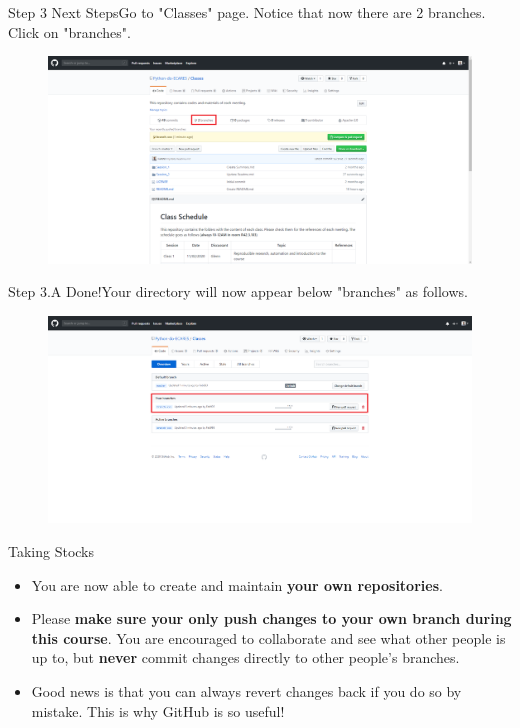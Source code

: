 \documentclass[aspectratio=169]{beamer}
\begin{document}
\begin{frame}{Step 3 Next Steps}{Go to "Classes" page. Notice that now there are 2 branches. Click on "branches".}
	\begin{figure}
		\centering
		\includegraphics[width=0.9\linewidth]{../images/step3}
	\end{figure}
\end{frame}

\begin{frame}{Step 3.A Done!}{Your directory will now appear below "branches" as follows.}
	\begin{figure}
		\centering
		\includegraphics[width=1\linewidth]{../images/step3.A}
	\end{figure}
\end{frame}

\begin{frame}{Taking Stocks}
\begin{itemize}\setlength\itemsep{2.5em}
	\item You are now able to create and maintain \textbf{your own repositories}.
	\item Please \textbf{make sure your only push changes to your own branch during this course}. You are encouraged to collaborate and see what other people is up to, but \textbf{never} commit changes directly to other people's branches.
	\item Good news is that you can always revert changes back if you do so by mistake. This is why GitHub is so useful!
\end{itemize}
\end{frame}
\end{document}

